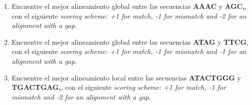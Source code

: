 \documentclass{article}
\begin{document}
	\begin{enumerate}
		\item 
		Encuentre el mejor alineamiento global entre las secuencias \textbf{AAAC} y \textbf{AGC,}, con el siguiente \textit{scoring scheme: +1 for match, -1 for mismatch and -2 for an alignment with a gap}.
		
		\item 
		Encuentre el mejor alineamiento global entre las secuencias \textbf{ATAG} y \textbf{TTCG}, con el siguiente \textit{scoring scheme: +1 for match, -1 for mismatch and -1 for an alignment with a gap}.
		
		\item 
		Encuentre el mejor alineamiento local entre las secuencias \textbf{ATACTGGG} y \textbf{TGACTGAG,}, con el siguiente \textit{scoring scheme: +1 for match, -1 for mismatch and -2 for an alignment with a gap}.
		

	

	\end{enumerate}
	
	
\end{document}

